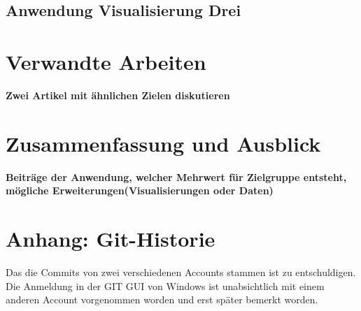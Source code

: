 \documentclass[usegeometry=true]{scrartcl}
\begin{document}
\subsection{Anwendung Visualisierung Drei}

\section{Verwandte Arbeiten}
\textbf{Zwei Artikel mit ähnlichen Zielen diskutieren}
\section{Zusammenfassung und Ausblick}

\textbf{Beiträge der Anwendung, welcher Mehrwert für Zielgruppe entsteht, mögliche Erweiterungen(Visualisierungen oder Daten)}

\newpage

\setcounter{page}{4}
\section*{Anhang: Git-Historie}
Das die Commits von zwei verschiedenen Accounts stammen ist zu entschuldigen. Die Anmeldung in der GIT GUI von Windows ist unabsichtlich mit einem anderen Account vorgenommen worden und erst später bemerkt worden.
\end{document}
